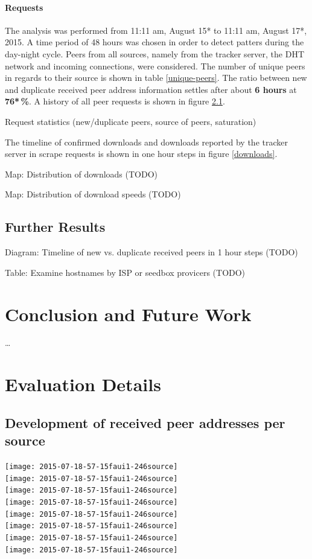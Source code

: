 \documentclass[10pt, a4paper, twoside]{scrartcl}
\renewcommand{\_}{\origunderscore\allowbreak}
\begin{document}
\paragraph{Requests}
The analysis was performed from 11:11 am, August 15* to 11:11 am, August 17*, 2015. A time period of 48 hours was chosen in order to detect patters during the day-night cycle. Peers from all sources, namely from the tracker server, the DHT network and incoming connections, were considered. The number of unique peers in regards to their source is shown in table \ref{unique-peers}. The ratio between new and duplicate received peer address information settles after about \textbf{6 hours} at \textbf{76*\,\%}. A history of all peer requests is shown in figure \ref{request-history}.

Request statistics (new/duplicate peers, source of peers, saturation)

The timeline of confirmed downloads and downloads reported by the tracker server in scrape requests is shown in one hour steps in figure \ref{downloads}.

Map: Distribution of downloads (TODO)

Map: Distribution of download speeds (TODO)

\subsection{Further Results}
Diagram: Timeline of new vs. duplicate received peers in 1 hour steps (TODO)

Table: Examine hostnames by ISP or seedbox provicers (TODO)
\cleardoublepage

\section{Conclusion and Future Work}
\dots
\cleardoublepage

\appendix
\section{Evaluation Details}
\subsection{Development of received peer addresses per source}
\label{request-history}
\texttt{[image: 2015-07-18\_21-57-15\_faui1-246\_source]}\\
\texttt{[image: 2015-07-18\_21-57-15\_faui1-246\_source]}\\
\texttt{[image: 2015-07-18\_21-57-15\_faui1-246\_source]}\\
\texttt{[image: 2015-07-18\_21-57-15\_faui1-246\_source]}\\
\texttt{[image: 2015-07-18\_21-57-15\_faui1-246\_source]}\\
\texttt{[image: 2015-07-18\_21-57-15\_faui1-246\_source]}\\
\texttt{[image: 2015-07-18\_21-57-15\_faui1-246\_source]}\\
\texttt{[image: 2015-07-18\_21-57-15\_faui1-246\_source]}
\end{document}
